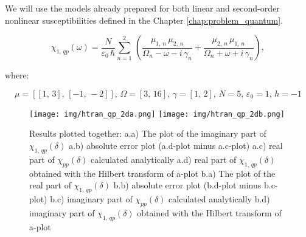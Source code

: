 \documentclass[12pt,twoside,a4paper]{article}
\numberwithin{equation}{subsection}
\numberwithin{figure}{subsection}
\begin{document}
We will use the models already prepared for both linear and second-order nonlinear susceptibilities defined
in the Chapter \ref{chap:problem_quantum}.

\begin{equation} \label{eq:htran_qpeq}
  \chi_{1, \,qp}(\omega ) = 
  \frac{N}{\varepsilon_0\,\hbar} \sum_{n=1}^{2}\,(\frac {{\mu_{1, \,n}}\,{\mu_{2, \,n}}}{{\Omega_{n}} - \omega -
  i\,{\gamma_{n}}} + \frac {{\mu_{2, \,n}}\,{\mu_{1, \,n}}}{{\Omega_{n}} + \omega + i\,{\gamma_{n}}}),
\end{equation}

where:

\begin{equation*}
  \mu = [[1, \,3], \,[ -1, \, -2]],\,\Omega =[3, \,16],\,\gamma =[1, \,2],\,N=5,\,\varepsilon_{0}=1, \,h= - 1
\end{equation*}



\begin{figure} 
  \texttt{[image: img/htran\_qp\_2da.png]} 
  \texttt{[image: img/htran\_qp\_2db.png]}  
  \caption{Results plotted together:
  a.a) The plot of the imaginary part of ${\chi_{1, \,qp}}(\delta )$ 
  a.b) absolute error plot (a.d-plot minus a.c-plot) 
  a.c) real part of ${\chi_{pp}}(\delta )$ calculated analytically
  a.d) real part of ${\chi_{1, \,qp}}(\delta )$ obtained with the Hilbert transform of a-plot
  b.a) The plot of the real part of ${\chi_{1, \,qp}}(\delta )$
  b.b) absolute error plot (b.d-plot minus b.c-plot)  
  b.c) imaginary part of ${\chi_{pp}}(\delta )$ calculated analytically 
  b.d) imaginary part of ${\chi_{1, \,qp}}(\delta )$ obtained with the Hilbert transform of a-plot 
  \label{htran_qp_2d}}
\end{figure}
\end{document}
